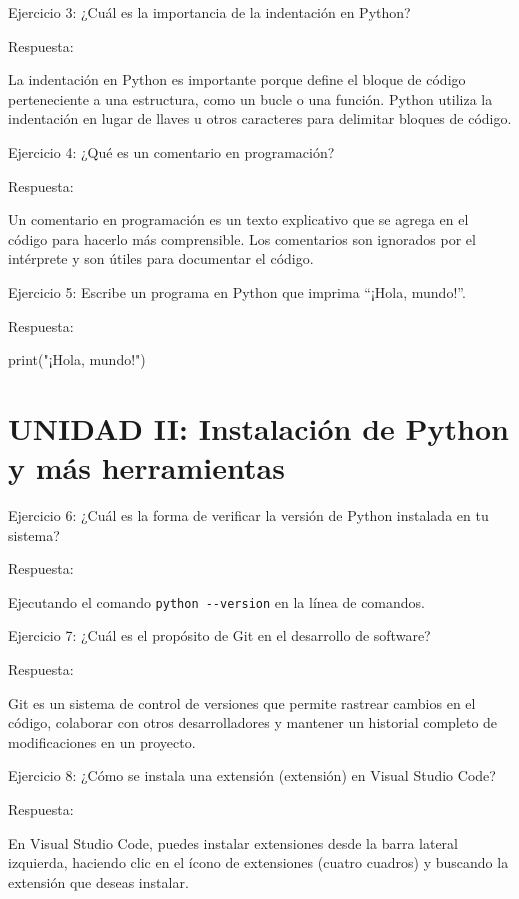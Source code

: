 \documentclass[
  a4paper,
  DIV=11,
  numbers=noendperiod,
  onepage,
  openany]{scrreprt}
\newenvironment{Shaded}{\begin{snugshade}}{\end{snugshade}}
\newcommand{\BuiltInTok}[1]{\textcolor[rgb]{0.00,0.23,0.31}{#1}}
\newcommand{\NormalTok}[1]{\textcolor[rgb]{0.00,0.23,0.31}{#1}}
\newcommand{\StringTok}[1]{\textcolor[rgb]{0.13,0.47,0.30}{#1}}
\begin{document}
Ejercicio 3: ¿Cuál es la importancia de la indentación en Python?

Respuesta:

La indentación en Python es importante porque define el bloque de código
perteneciente a una estructura, como un bucle o una función. Python
utiliza la indentación en lugar de llaves u otros caracteres para
delimitar bloques de código.

Ejercicio 4: ¿Qué es un comentario en programación?

Respuesta:

Un comentario en programación es un texto explicativo que se agrega en
el código para hacerlo más comprensible. Los comentarios son ignorados
por el intérprete y son útiles para documentar el código.

Ejercicio 5: Escribe un programa en Python que imprima ``¡Hola,
mundo!''.

Respuesta:

\begin{Shaded}
\begin{Highlighting}[]
\BuiltInTok{print}\NormalTok{(}\StringTok{"¡Hola, mundo!"}\NormalTok{)}
\end{Highlighting}
\end{Shaded}

\hypertarget{unidad-ii-instalaciuxf3n-de-python-y-muxe1s-herramientas}{%
\section{UNIDAD II: Instalación de Python y más
herramientas}\label{unidad-ii-instalaciuxf3n-de-python-y-muxe1s-herramientas}}

Ejercicio 6: ¿Cuál es la forma de verificar la versión de Python
instalada en tu sistema?

Respuesta:

Ejecutando el comando \texttt{python\ -\/-version} en la línea de
comandos.

Ejercicio 7: ¿Cuál es el propósito de Git en el desarrollo de software?

Respuesta:

Git es un sistema de control de versiones que permite rastrear cambios
en el código, colaborar con otros desarrolladores y mantener un
historial completo de modificaciones en un proyecto.

Ejercicio 8: ¿Cómo se instala una extensión (extensión) en Visual Studio
Code?

Respuesta:

En Visual Studio Code, puedes instalar extensiones desde la barra
lateral izquierda, haciendo clic en el ícono de extensiones (cuatro
cuadros) y buscando la extensión que deseas instalar.
\end{document}
